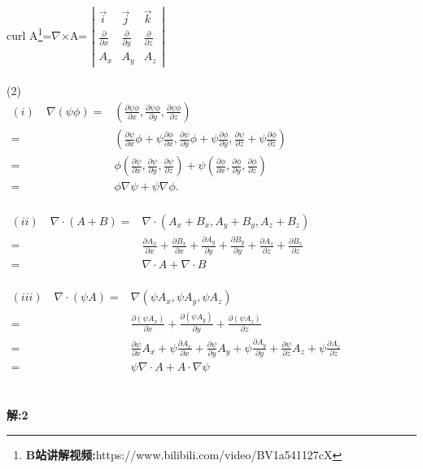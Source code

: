 \documentclass[a4paper,11pt,UTF8]{article}%
\theoremstyle{plain}
\begin{document}
	\indent curl A\footnote{\noindent \textbf{B站讲解视频:}https://www.bilibili.com/video/BV1a541127cX}=$\nabla$$\times$A=
	$\left|
	\begin{array}{cccc}
		\overrightarrow{i}&\overrightarrow{j}&\overrightarrow{k}\\
		\frac{\partial}{\partial x}&\frac{\partial}{\partial y}&\frac{\partial}{\partial z}\\
		A_x&A_y&A_z
	\end{array}\right|$\\
	~\\
	(2)\\
	\indent $\begin{aligned}
			(i)\quad\nabla\left(\psi\phi\right)=&\left(\frac{\partial\psi\phi}{\partial x}, \frac{\partial \psi\phi}{\partial y}, \frac{\partial \psi\phi}{\partial z}\right)\\
			=&\left(\frac{\partial \psi}{\partial x}\phi+\psi\frac{\partial \phi}{\partial x},\frac{\partial \psi}{\partial y}\phi+\psi\frac{\partial \phi}{\partial y},\frac{\partial \psi}{\partial z}+\psi\frac{\partial \phi}{\partial z}\right)\\
			=&\phi\left(\frac{\partial \psi}{\partial x},\frac{\partial \psi}{\partial y},\frac{\partial \psi}{\partial z}\right)+\psi\left(\frac{\partial \phi}{\partial x},\frac{\partial \phi}{\partial y},\frac{\partial \phi}{\partial z}\right)\\
			=&\phi\nabla\psi+\psi\nabla\phi.
	\end{aligned}$\\
	~\\
	\indent $\begin{aligned}
	   (ii)\quad\nabla\cdot\left(A+B\right)=&\nabla\cdot\left(A_x+B_x,A_y+B_y,A_z+B_z\right)\\
	   =&\frac{\partial A_x}{\partial x}+\frac{\partial B_x}{\partial x}+\frac{\partial A_y}{\partial y}+\frac{\partial B_y}{\partial y}+\frac{\partial A_z}{\partial z}+\frac{\partial B_z}{\partial z}\\
	   =&\nabla\cdot A+\nabla\cdot B
	\end{aligned}$\\
	~\\
	\indent $\begin{aligned}
	(iii)\quad\nabla\cdot\left(\psi A\right)=&\nabla\left(\psi A_x,\psi A_y,\psi A_z\right)\\
	=&\frac{\partial\left(\psi A_x\right)}{\partial x}+\frac{\partial\left(\psi A_y\right)}{\partial y}+\frac{\partial\left(\psi A_z\right)}{\partial z}\\
	=&\frac{\partial\psi}{\partial x}A_x+\psi\frac{\partial A_x}{\partial x}+\frac{\partial\psi}{\partial y}A_y+\psi\frac{\partial A_y}{\partial y}+\frac{\partial \psi}{\partial z}A_z+\psi\frac{\partial A_z}{\partial z}\\
	=&\psi\nabla\cdot A+A\cdot\nabla\psi
\end{aligned}$\\
~\\
~\\
		\noindent \textbf{解:2}\\
\end{document}
